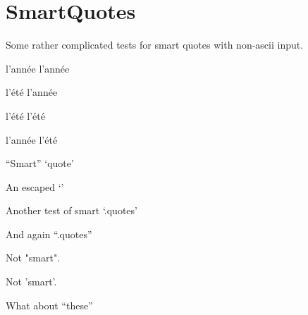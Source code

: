 
\def\mytitle{SmartQuotes Test}


\part{SmartQuotes}
\label{smartquotes}

Some rather complicated tests for smart quotes with non-ascii input.

l'année l'année

l'été l'année

l'été l'été

l'année l'été

``Smart'' `quote'

An escaped `\textbar{}'

Another test of smart `.quotes'

And again ``.quotes''

Not "smart".

Not 'smart'.

What about ``these''




